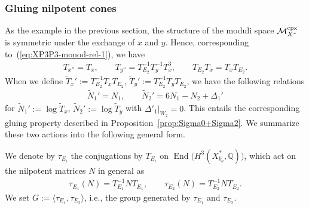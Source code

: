 \documentclass[10pt,a4paper]{amsart}
\numberwithin{equation}{section}
\begin{document}
\subsubsection{Gluing nilpotent cones} As the example in the previous section, the structure of the moduli space $\mathcal{M}_{X^{*}}^{\rm cpx}$ is
symmetric under the exchange of $x$ and $y$. Hence, corresponding to~(\ref{eq:XP3P3-monod-rel-1}), we have
\begin{gather}
\boxed{T_{x''}=T_{x},\qquad T_{y''}=T_{E_{2}}^{-1}T_{y}^{-1}T_{x}^{3},\qquad T_{E_{2}}T_{x}=T_{x}T_{E_{2}}.}\label{eq:XP3P3-monod-rel-2}
\end{gather}
When we define $\tilde{T}_{x}':=T_{E_{2}}^{-1}T_{x}T_{E_{2}}$, $\tilde{T}_{y}':=T_{E_{2}}^{-1}T_{y}T_{E_{2}}$,
we have the following relations
\begin{gather*}
\tilde{N}_{1}'=N_{1},\qquad \tilde{N}_{2}'=6N_{1}-N_{2}+\Delta_{1}'
\end{gather*}
for $\tilde{N}_{1}':=\log\tilde{T}_{x}$, $\tilde{N}_{2}':=\log\tilde{T}_{y}$ with $\Delta'_{1}\vert_{W_{2}}=0$. This entails the corresponding
gluing property described in Proposition~\ref{prop:Sigma0+Sigma2}. We summarize these two actions into the following general form.
\begin{Definition}
We denote by $\tau_{E_{i}}$ the conjugations by $T_{E_{i}}$ on $\operatorname{End}\big(H^{3}(X_{b_{o}}^{*},\mathbb{Q})\big)$,
which act on the nilpotent matrices $N$ in general as
\begin{gather*}
\tau_{E_{1}}(N)=T_{E_{1}}^{-1}NT_{E_{1}},\qquad \tau_{E_{2}}(N)=T_{E_{2}}^{-1}NT_{E_{2}}.
\end{gather*}
We set $G:=\langle\tau_{E_{1}},\tau_{E_{2}}\rangle$, i.e., the group generated by $\tau_{E_{1}}$ and $\tau_{E_{2}}$.
\end{Definition}
\end{document}
